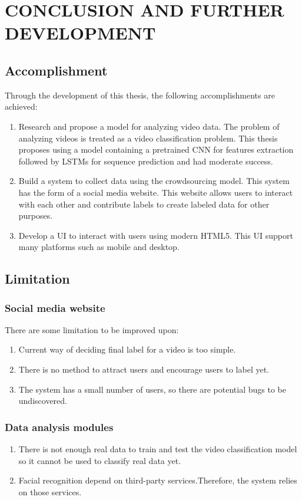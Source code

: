 \chapter{CONCLUSION AND FURTHER DEVELOPMENT}

\section{Accomplishment}
Through the development of this thesis, the following accomplishments are achieved:
\begin{enumerate}
    \item Research and propose a model for analyzing video data. The problem of analyzing videos is treated as a video classification problem. This thesis proposes using a model containing a pretrained CNN for features extraction followed by LSTMs for sequence prediction and had moderate success.
    \item Build a system to collect data using the crowdsourcing model. This system has the form of a social media website. This website allows users to interact with each other and contribute labels to create labeled data for other purposes.
    \item Develop a UI to interact with users using modern HTML5. This UI support many platforms such as mobile and desktop.
\end{enumerate}


\section{Limitation}
\subsection{Social media website}
There are some limitation to be improved upon:

\begin{enumerate}

\item Current way of deciding final label for a video is too simple.
\item There is no method to attract users and encourage users to label yet.
\item The system has a small number of users, so there are potential bugs to be undiscovered.
 
\end{enumerate}
\subsection{Data analysis modules}
\begin{enumerate}

\item There is not enough real data to train and test the video classification model so it cannot be used to classify real data yet.
\item Facial recognition depend on third-party services.Therefore, the system relies on those services.

\end{enumerate}

